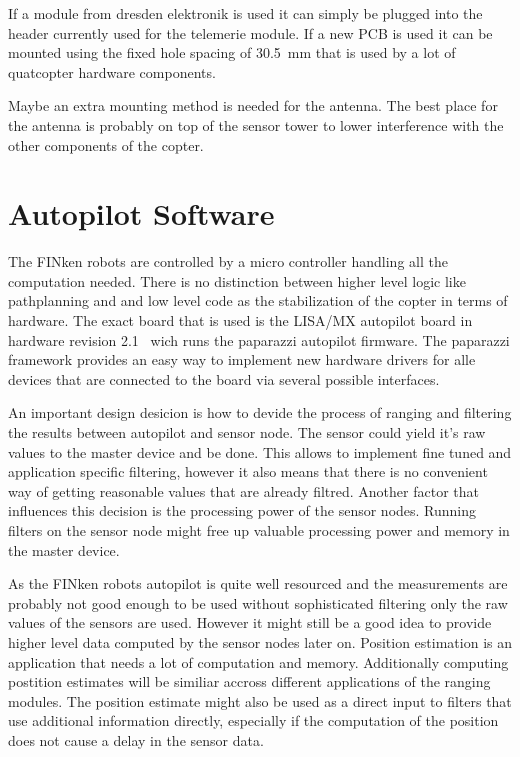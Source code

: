 If a module from dresden elektronik is used it can simply be plugged into the header currently used for the telemerie module.
If a new PCB is used it can be mounted using the fixed hole spacing of \SI{30.5}{mm} that is used by a lot of quatcopter hardware components.

Maybe an extra mounting method is needed for the antenna.
The best place for the antenna is probably on top of the sensor tower to lower interference with the other components of the copter.

\section{Autopilot Software}
The FINken robots are controlled by a micro controller handling all the computation needed.
There is no distinction between higher level logic like pathplanning and and low level code as the stabilization of the copter in terms of hardware.
The exact board that is used is the LISA/MX autopilot board in hardware revision 2.1~\cite{lisamx} wich runs the paparazzi autopilot firmware\cite{paparazzi}.
The paparazzi framework provides an easy way to implement new hardware drivers for alle devices that are connected to the board via several possible interfaces.

An important design desicion is how to devide the process of ranging and filtering the results between autopilot and sensor node.
The sensor could yield it's raw values to the master device and be done.
This allows to implement fine tuned and application specific filtering, however it also means that there is no convenient way of getting reasonable values that are already filtred.
Another factor that influences this decision is the processing power of the sensor nodes.
Running filters on the sensor node might free up valuable processing power and memory in the master device.

As the FINken robots autopilot is quite well resourced and the measurements are probably not good enough to be used without sophisticated filtering only the raw values of the sensors are used.
However it might still be a good idea to provide higher level data computed by the sensor nodes later on.
Position estimation is an application that needs a lot of computation and memory.
Additionally computing postition estimates will be similiar accross different applications of the ranging modules.
The position estimate might also be used as a direct input to filters that use additional information directly, especially if the computation of the position does not cause a delay in the sensor data.



